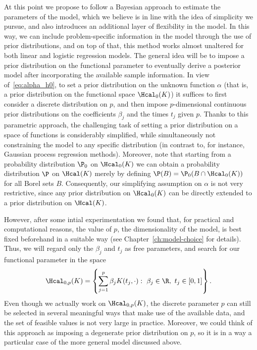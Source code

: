 At this point we propose to follow a Bayesian approach to estimate the parameters of the model, which we believe is in line with the idea of simplicity we pursue, and also introduces an additional layer of flexibility in the model. In this way, we can include problem-specific information in the model through the use of prior distributions, and on top of that, this method works almost unaltered for both linear and logistic regression models. The general idea will be to impose a prior distribution on the functional parameter to eventually derive a posterior model after incorporating the available sample information. In view of~\eqref{eq:alpha_h0}, to set a prior distribution on the unknown function \(\alpha\) (that is, a prior distribution on the functional space \(\Hcal_0(K)\)) it suffices to first consider a discrete distribution on \(p\), and then impose \(p\)-dimensional continuous prior distributions on the coefficients \(\beta_j\) and the times \(t_j\) given \(p\). Thanks to this parametric approach, the challenging task of setting a prior distribution on a space of functions is considerably simplified, while simultaneously not constraining the model to any specific distribution (in contrast to, for instance, Gaussian process regression methods). Moreover, note that starting from a probability distribution \(\P_0\) on \(\Hcal_0(K)\) we can obtain a probability distribution \(\P\) on \(\Hcal(K)\) merely by defining \(\P(B) = \P_0(B\cap \Hcal_0(K))\) for all Borel sets \(B\). Consequently, our simplifying assumption on \(\alpha\) is not very restrictive, since any prior distribution on \(\Hcal_0(K)\) can be directly extended to a prior distribution on \(\Hcal(K)\).

However, after some intial experimentation we found that, for practical and computational reasons, the value of \(p\), the dimensionality of the model, is best fixed beforehand in a suitable way (see Chapter~\ref{ch:model-choice} for details). Thus, we will regard only the \(\beta_j\) and \(t_j\) as free parameters, and search for our functional parameter in the space
\begin{equation}\label{eq:h0p}
\Hcal_{0,p}(K)=\left\{ \sum_{j=1}^p \beta_j K(t_j, \cdot): \ \beta_j \in \R, \ t_j \in [0, 1]\right\}.
\end{equation}
Even though we actually work on \(\Hcal_{0,p}(K)\), the discrete parameter \(p\) can still be selected in several meaningful ways that make use of the available data, and the set of feasible values is not very large in practice. Moreover, we could think of this approach as imposing a degenerate prior distribution on \(p\), so it is in a way a particular case of the more general model discussed above.

